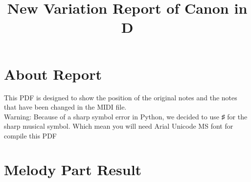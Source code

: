 \documentclass{article}
\title{New Variation Report of Canon in D}
\begin{document}
\maketitle
\section*{About Report}
This PDF is designed to show the position of the original notes and the notes that have been changed in the MIDI file. \\
Warning: Because of a sharp symbol error in Python, we decided to use ♯ for the sharp musical symbol. Which mean you will need Arial Unicode MS font for compile this PDF
\section*{Melody Part Result}
\end{document}
